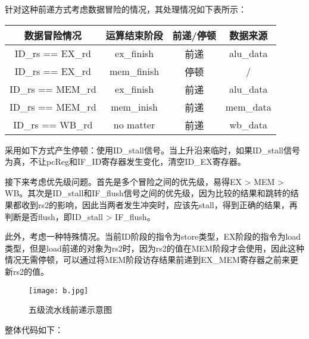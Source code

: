 \documentclass{article}
\begin{document}
        \newline{}
        \par{}
        针对这种前递方式考虑数据冒险的情况，其处理情况如下表所示：
        \begin{center}
            \begin{tabular}{|c|c|c|c|}
            \hline
                数据冒险情况 & 运算结束阶段 & 前递/停顿 & 数据来源 \\
            \hline
                ID\_rs == EX\_rd & ex\_finish & 前递 & alu\_data \\ 
                ID\_rs == EX\_rd & mem\_finish & 停顿 & / \\ 
                ID\_rs == MEM\_rd & ex\_finish & 前递 & alu\_data \\
                ID\_rs == MEM\_rd & mem\_inish & 前递 & mem\_data \\
                ID\_rs == WB\_rd & no matter & 前递 & wb\_data \\
            \hline
            \end{tabular}
        \end{center}
        \par{}
        采用如下方式产生停顿：使用ID\_stall信号。当上升沿来临时，如果ID\_stall信号为真，不让pcReg和IF\_ID寄存器发生变化，清空ID\_EX寄存器。
        \par{}
        接下来考虑优先级问题。首先是多个冒险之间的优先级，易得EX > MEM > WB。其次是ID\_stall和IF\_flush信号之间的优先级，因为比较的结果和跳转的结果都收到rs2的影响，因此当两者发生冲突时，应该先stall，得到正确的结果，再判断是否flush，即ID\_stall > IF\_flush。
        \par{}
        此外，考虑一种特殊情况。当前ID阶段的指令为store类型，EX阶段的指令为load类型，但是load前递的对象为rs2时，因为rs2的值在MEM阶段才会使用，因此这种情况无需停顿，可以通过将MEM阶段访存结果前递到EX\_MEM寄存器之前来更新rs2的值。    
        \newline{}
        \begin{figure}[ht]
            \centering
            \texttt{[image: b.jpg]}
            \caption{五级流水线前递示意图}
        \end{figure}
        \par{}
        整体代码如下：
\end{document}
